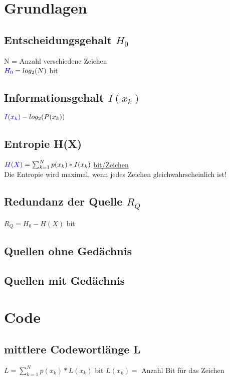 
\section{Grundlagen}


\subsection{Entscheidungsgehalt $H_0$}
N = Anzahl verschiedene Zeichen\\
\colorbox{lightlightgrey}{$\textcolor{blue}{H_0} = log_2(N)$} bit


\subsection{Informationsgehalt $I(x_k)$}
\colorbox{lightlightgrey}{$\textcolor{blue}{I(x_k)} -log_2(P(x_k))$}


\subsection{Entropie H(X)}
\colorbox{lightlightgrey}{$\textcolor{blue}{H(X)} = \sum_{k = 1}^{N}p(x_k) * I(x_k)$} \underline{bit/Zeichen}\\
Die Entropie wird maximal, wenn jedes Zeichen gleichwahrscheinlich ist!


\subsection{Redundanz der Quelle $R_Q$}
\colorbox{lightlightgrey}{$R_Q = H_0 - H(X)$ bit}



\subsection{Quellen ohne Gedächnis}



\subsection{Quellen mit Gedächnis}





\section{Code}
\subsection{mittlere Codewortlänge L}
\colorbox{lightlightgrey}{$L = \sum_{k = 1}^{N}p(x_k) * L(x_k)$ bit} $L(x_k) =$ Anzahl Bit für das Zeichen
